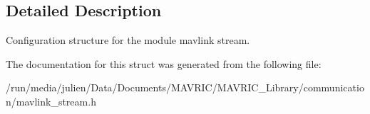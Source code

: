 \subsection{Detailed Description}
Configuration structure for the module mavlink stream. 

The documentation for this struct was generated from the following file\+:\begin{DoxyCompactItemize}
\item 
/run/media/julien/\+Data/\+Documents/\+M\+A\+V\+R\+I\+C/\+M\+A\+V\+R\+I\+C\+\_\+\+Library/communication/mavlink\+\_\+stream.\+h\end{DoxyCompactItemize}
